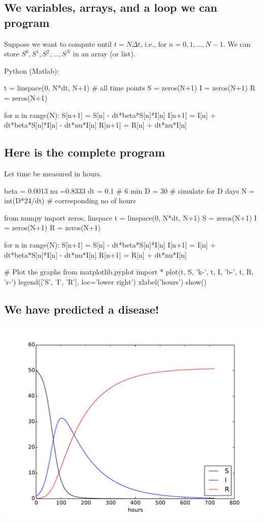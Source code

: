 \documentclass[%
twoside,                 %
final,                   %
10pt]{article}
\begin{document}
\subsection{We variables, arrays, and a loop we can program}

Suppose we want to compute until $t=N\Delta t$, i.e., for $n=0,1,\ldots,N-1$.
We can store $S^0, S^1, S^2, \ldots, S^N$ in an array (or list).

Python (Matlab):

\bpycod
t = linspace(0, N*dt, N+1)  # all time points
S = zeros(N+1)
I = zeros(N+1)
R = zeros(N+1)

for n in range(N):
    S[n+1] = S[n] - dt*beta*S[n]*I[n]
    I[n+1] = I[n] + dt*beta*S[n]*I[n] - dt*nu*I[n]
    R[n+1] = R[n] + dt*nu*I[n]
\epycod

\subsection{Here is the complete program}

Let time be measured in hours.

\bpycod
beta = 0.0013
nu =0.8333
dt = 0.1             # 6 min
D = 30               # simulate for D days
N = int(D*24/dt)     # corresponding no of hours

from numpy import zeros, linspace
t = linspace(0, N*dt, N+1)
S = zeros(N+1)
I = zeros(N+1)
R = zeros(N+1)

for n in range(N):
    S[n+1] = S[n] - dt*beta*S[n]*I[n]
    I[n+1] = I[n] + dt*beta*S[n]*I[n] - dt*nu*I[n]
    R[n+1] = R[n] + dt*nu*I[n]

# Plot the graphs
from matplotlib.pyplot import *
plot(t, S, 'k-', t, I, 'b-', t, R, 'r-')
legend(['S', 'I', 'R'], loc='lower right')
xlabel('hours')
show()
\epycod

\subsection{We have predicted a disease!}


\begin{center}  %
  \centerline{\includegraphics[width=0.9\linewidth]{fig/SIR1.pdf}}
\end{center}
\end{document}
